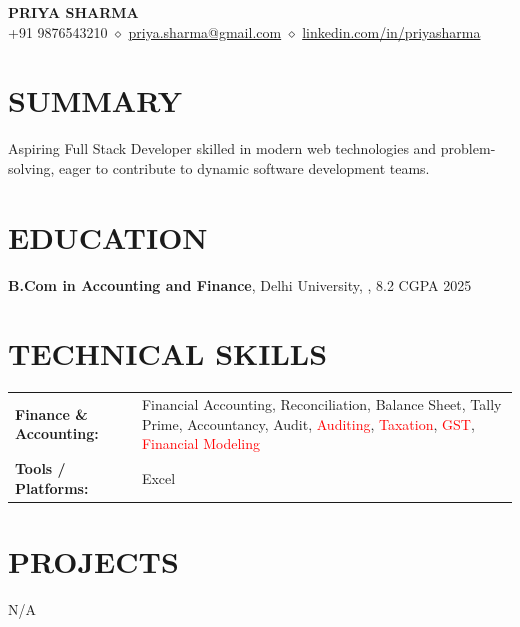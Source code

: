 \documentclass[8.5pt,a4paper]{extarticle}
\begin{document}
\begin{center}
{\large \textbf{PRIYA SHARMA}} \\ \vspace{1pt}
{\footnotesize +91 9876543210 $\diamond$ \href{mailto:priya.sharma@gmail.com}{priya.sharma@gmail.com} $\diamond$ \href{https://linkedin.com/in/priyasharma}{linkedin.com/in/priyasharma}}
\end{center}

\section*{SUMMARY}
{\small Aspiring Full Stack Developer skilled in modern web technologies and problem-solving, eager to contribute to dynamic software development teams.}

\section*{EDUCATION}
{\small \noindent \textbf{B.Com in Accounting and Finance}, Delhi University, , 8.2 CGPA \hfill 2025 \\ \vspace{4pt}

}
\section*{TECHNICAL SKILLS}
\small
\begin{tabular}{@{}p{2.2in}p{5.1in}@{}}
\textbf{Finance \& Accounting:} & Financial Accounting, Reconciliation, Balance Sheet, Tally Prime, Accountancy, Audit, \textcolor{red}{Auditing}, \textcolor{red}{Taxation}, \textcolor{red}{GST}, \textcolor{red}{Financial Modeling} \\
\textbf{Tools / Platforms:} & Excel \\
\end{tabular}



\section*{PROJECTS}
{\small N/A

}
\end{document}
